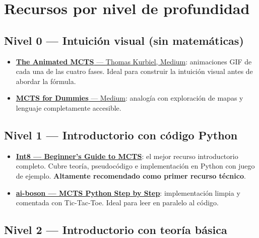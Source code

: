 \documentclass[12pt, a4paper]{article}
\begin{document}
\section{Recursos por nivel de profundidad}

\subsection*{Nivel 0 — Intuición visual (sin matemáticas)}

\begin{itemize}
  \item \href{https://medium.com/data-science/the-animated-monte-carlo-tree-search-mcts-c05bb48b018c}%
    {\textbf{The Animated MCTS} — Thomas Kurbiel, Medium}: animaciones GIF de
    cada una de las cuatro fases. Ideal para construir la intuición visual antes
    de abordar la fórmula.

  \item \href{https://medium.com/@_michelangelo_/monte-carlo-tree-search-mcts-algorithm-for-dummies-74b2bae53bfa}%
    {\textbf{MCTS for Dummies} — Medium}: analogía con exploración de mapas y
    lenguaje completamente accesible.
\end{itemize}

\subsection*{Nivel 1 — Introductorio con código Python}

\begin{itemize}
  \item \href{https://int8.io/monte-carlo-tree-search-beginners-guide/}%
    {\textbf{Int8 — Beginner's Guide to MCTS}}: el mejor recurso introductorio
    completo. Cubre teoría, pseudocódigo e implementación en Python con juego
    de ejemplo. \textbf{Altamente recomendado como primer recurso técnico}.

  \item \href{https://ai-boson.github.io/mcts/}%
    {\textbf{ai-boson — MCTS Python Step by Step}}: implementación limpia y
    comentada con Tic-Tac-Toe. Ideal para leer en paralelo al código.
\end{itemize}

\subsection*{Nivel 2 — Introductorio con teoría básica}
\end{document}
